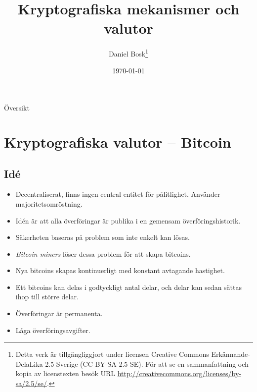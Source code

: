 \documentclass{beamer}
\title{%
  Kryptografiska mekanismer och valutor
}
\author{Daniel Bosk\footnote{%
  Detta verk är tillgängliggjort under licensen Creative Commons 
  Erkännande-DelaLika 2.5 Sverige (CC BY-SA 2.5 SE).
	För att se en sammanfattning och kopia av licenstexten besök URL 
	\url{http://creativecommons.org/licenses/by-sa/2.5/se/}.
}}
\institute[MIUN IKS]{%
  Avdelningen för informations- och kommunikationssytem (IKS),\\
  Mittuniversitetet, Sundsvall.
}
\date{\today}
\begin{document}
\begin{frame}
  \titlepage{}
\end{frame}

\begin{frame}{Översikt}
  \tableofcontents{}
\end{frame}





\section{Kryptografiska valutor -- Bitcoin}

\subsection{Idé}

\begin{frame}{\insertsubsectionhead}
  \begin{itemize}
    \item Decentraliserat, finns ingen central entitet för pålitlighet.
      Använder majoritetsomröstning.
    \item Idén är att alla överföringar är publika i en gemensam 
      överföringshistorik.
    \item Säkerheten baseras på problem som inte enkelt kan lösas.
    \item \emph{Bitcoin miners} löser dessa problem för att skapa bitcoins.
    \item Nya bitcoins skapas kontinuerligt med konstant avtagande hastighet.
    \item Ett bitcoins kan delas i godtyckligt antal delar, och delar kan sedan 
      sättas ihop till större delar.
    \item Överföringar är permanenta.
    \item Låga överföringsavgifter.
  \end{itemize}
\end{frame}
\end{document}
